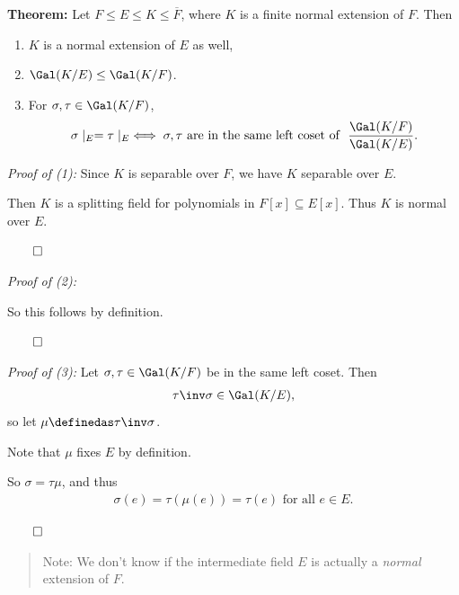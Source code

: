 \textbf{Theorem:} Let \(F \leq E \leq K \leq \overline F\), where \(K\)
is a finite normal extension of \(F\). Then

\begin{enumerate}
\def\labelenumi{\arabic{enumi}.}
\item
  \(K\) is a normal extension of \(E\) as well,
\item
  \(\Gal(K/E) \leq \Gal(K/F)\).
\item
  For \(\sigma, \tau \in \Gal(K/F)\),
  \begin{align*}
  \sigma\mid_E = \tau\mid_E
  \iff
  \sigma, \tau \text{ are in the same left coset of }~
  \frac{\Gal(K/F)}{\Gal(K/E)}
  .\end{align*}
\end{enumerate}

\emph{Proof of (1):} Since \(K\) is separable over \(F\), we have \(K\)
separable over \(E\).

Then \(K\) is a splitting field for polynomials in
\(F[x] \subseteq E[x]\). Thus \(K\) is normal over \(E\).

\(\qed\)

\emph{Proof of (2):}

\begin{center}
\end{center}

So this follows by definition.

\(\qed\)

\emph{Proof of (3):} Let \(\sigma, \tau \in \Gal(K/F)\) be in the same
left coset. Then
\begin{align*}
\tau\inv\sigma \in \Gal(K/E)
,\end{align*} so let \(\mu \definedas \tau\inv\sigma\).

Note that \(\mu\) fixes \(E\) by definition.

So \(\sigma = \tau \mu\), and thus
\begin{align*}
\sigma(e) = \tau(\mu(e)) = \tau(e) \text{ for all } e\in E
.\end{align*}

\(\qed\)

\begin{quote}
Note: We don't know if the intermediate field \(E\) is actually a
\emph{normal} extension of \(F\).
\end{quote}

